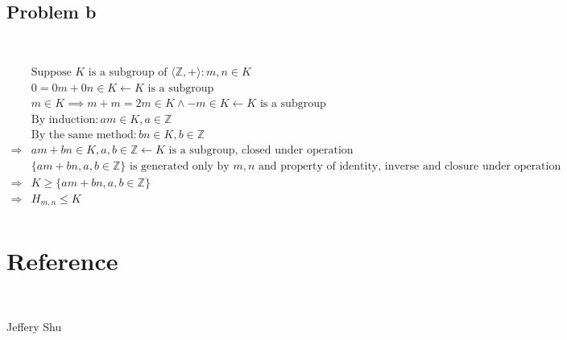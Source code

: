 \documentclass{article}
\begin{document}
~

\subsection*{Problem b}

~

\begin{equation*}
    \begin{split}
        &\text{Suppose }K\text{ is a subgroup of }\langle\mathbb{Z} ,+\rangle:m,n\in K\\
        &0=0m+0n\in K\leftarrow K\text{ is a subgroup}\\
        &m\in K\implies m+m=2m\in K\land -m\in K\leftarrow K\text{ is a subgroup}\\
        &\text{By induction}:am\in K,a\in\mathbb{Z}\\
        &\text{By the same method}:bn\in K,b\in\mathbb{Z} \\
        \Rightarrow&am+bn\in K,a,b\in\mathbb{Z} \leftarrow K\text{ is a subgroup, closed under operation}\\
        &\{am+bn,a,b\in\mathbb{Z} \}\text{ is generated only by }m,n\text{ and property of identity, inverse and closure under operation}\\
        \Rightarrow&K\geqslant \{am+bn,a,b\in\mathbb{Z} \}\\
        \Rightarrow&H_{m,n}\leqslant K\\
    \end{split}
\end{equation*}

\newpage

\section*{Reference}

~

Jeffery Shu
\end{document}
